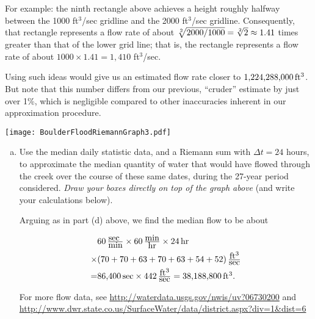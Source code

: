 \documentclass[12pt]{article}
\def\Red{\color{red}}
\def\Black{\color{black}}
\def\Red{\color{red}}
\def\Black{\color{black}}
\begin{document}
\begin{enumerate}[(a)]
 
For example:  the ninth rectangle above achieves a height roughly halfway between the 1000 ft$^3$/sec gridline and the 2000 ft$^3$/sec gridline.  Consequently,  that rectangle represents a flow rate of about  $\root{2}\of {2000/1000}=\root2\of2\approx 1.41$ times greater than that of the lower grid line;  that is, the rectangle represents a flow rate of about  $1000\times 1.41=1,410$ ft$^3$/sec.  


Using such ideas would give us an estimated flow rate closer to $\hbox{1,224,288,000}\, \hbox{ft$^3$}$.  But note that  this number differs from our previous, ``cruder'' estimate by just over 1\%, which is negligible compared to other inaccuracies inherent in our approximation procedure.  \Black
\end{enumerate}\vfill\eject
 


\begin{center}
\texttt{[image: BoulderFloodRiemannGraph3.pdf]}
\end{center}
\begin{enumerate}[(a)]\addtocounter{enumi}{4}
\item Use the median daily statistic data, and a Riemann sum with $\Delta t = 24$ hours, to approximate the median quantity of water that would have flowed through the creek over the course of these same dates, during the 27-year period considered. {\it Draw your boxes directly on top of the graph above} (and write your calculations below).

\Red Arguing as in part (d) above, we find the median flow to be about

\begin{align*} & 60\,  {\textstyle\frac{\hbox{sec }}{\hbox{min}}}\times 60\, {\textstyle\frac{\hbox{min}}{\hbox{hr}}}\times24\, \hbox{hr}\\\times &(70+70 +63+70+63+54+52) \,{\textstyle\frac{\hbox{ft$^3$}}{\hbox{sec}}}
\\=& \hbox{86,400}\, \hbox{sec} \times 442\,{\textstyle\frac{\hbox{ft$^3$}}{\hbox{sec}}}  =\hbox{38,188,800}\, \hbox{ft$^3$}.\end{align*} 

\vfill\Black

For more flow data, see \url{http://waterdata.usgs.gov/nwis/uv?06730200} and \\ \url{http://www.dwr.state.co.us/SurfaceWater/data/district.aspx?div=1&dist=6}

\end{enumerate}
\end{document}
